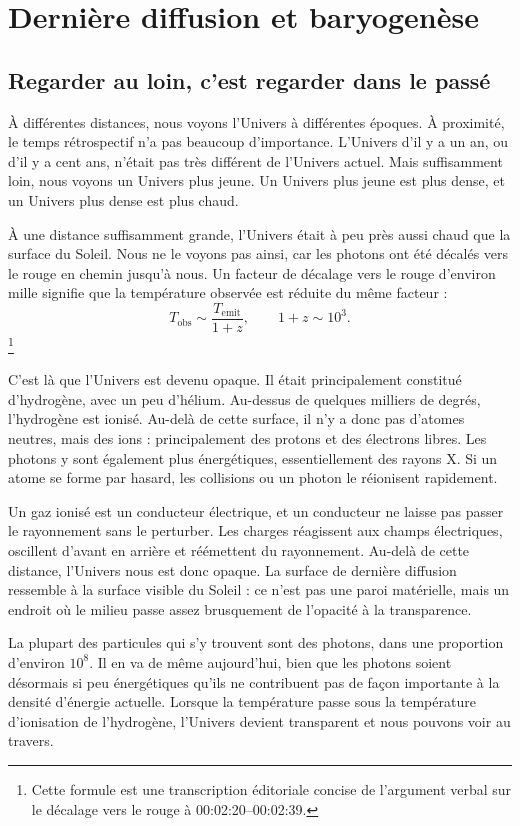 \chapter{Dernière diffusion et baryogenèse}

\section{Regarder au loin, c’est regarder dans le passé}

À différentes distances, nous voyons l’Univers à différentes époques. À proximité, le temps rétrospectif n’a pas beaucoup d’importance. L’Univers d’il y a un an, ou d’il y a cent ans, n’était pas très différent de l’Univers actuel. Mais suffisamment loin, nous voyons un Univers plus jeune. Un Univers plus jeune est plus dense, et un Univers plus dense est plus chaud.

À une distance suffisamment grande, l’Univers était à peu près aussi chaud que la surface du Soleil. Nous ne le voyons pas ainsi, car les photons ont été décalés vers le rouge en chemin jusqu’à nous. Un facteur de décalage vers le rouge d’environ mille signifie que la température observée est réduite du même facteur :
\[
T_{\mathrm{obs}} \sim \frac{T_{\mathrm{emit}}}{1+z},
\qquad
1+z \sim 10^3.
\]\footnote{Cette formule est une transcription éditoriale concise de l’argument verbal sur le décalage vers le rouge à 00:02:20--00:02:39.}

C’est là que l’Univers est devenu opaque. Il était principalement constitué d’hydrogène, avec un peu d’hélium. Au-dessus de quelques milliers de degrés, l’hydrogène est ionisé. Au-delà de cette surface, il n’y a donc pas d’atomes neutres, mais des ions : principalement des protons et des électrons libres. Les photons y sont également plus énergétiques, essentiellement des rayons X. Si un atome se forme par hasard, les collisions ou un photon le réionisent rapidement.

Un gaz ionisé est un conducteur électrique, et un conducteur ne laisse pas passer le rayonnement sans le perturber. Les charges réagissent aux champs électriques, oscillent d’avant en arrière et réémettent du rayonnement. Au-delà de cette distance, l’Univers nous est donc opaque. La surface de dernière diffusion ressemble à la surface visible du Soleil : ce n’est pas une paroi matérielle, mais un endroit où le milieu passe assez brusquement de l’opacité à la transparence.

La plupart des particules qui s’y trouvent sont des photons, dans une proportion d’environ \(10^8\). Il en va de même aujourd’hui, bien que les photons soient désormais si peu énergétiques qu’ils ne contribuent pas de façon importante à la densité d’énergie actuelle. Lorsque la température passe sous la température d’ionisation de l’hydrogène, l’Univers devient transparent et nous pouvons voir au travers.

